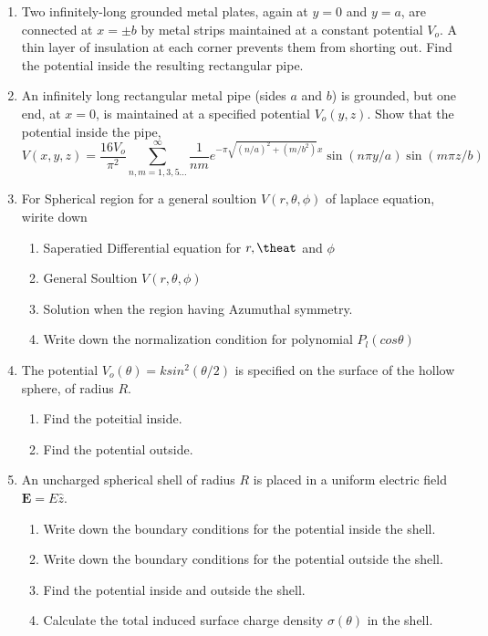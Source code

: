 \documentclass{bookq}[12pt, a4paper]
\newcommand{\gfrac}[2]{\frac{\displaystyle #1}{\displaystyle #2}}
\begin{document}
\begin{enumerate}
\item Two inﬁnitely-long grounded metal plates, again at $y = 0$ and
$y = a$, are connected at $x = \pm b$ by metal strips maintained at a constant potential
$V_o$. A thin layer of insulation at each corner prevents them
from shorting out. Find the potential inside the resulting rectangular pipe.

\item An inﬁnitely long rectangular metal pipe (sides $a$ and $b$) is
grounded, but one end, at $x = 0$, is maintained at a speciﬁed potential $V_o (y, z)$. Show that the potential inside the pipe,
$$
V(x, y, z) = \gfrac{16V_o}{\pi^2} \sum_{n, m = 1, 3, 5 \dots}^{\infty} \gfrac{1}{nm}e^{-\pi\sqrt{(n/a)^2 + (m/b^2)}x}\sin(n\pi y/a)\sin(m \pi z/b)
$$

\item For Spherical region for a general soultion $V(r, \theta, \phi)$ of laplace equation, wirite down
\begin{enumerate}
\item Saperatied Differential equation for $r, \theat$ and $\phi$
\item General Soultion $V(r, \theta, \phi)$
\item Solution when the region having Azumuthal symmetry.
\item Write down the normalization condition for polynomial $P_l(cos\theta)$
\end{enumerate}

\item The potential $V_o(\theta) = ksin^2(\theta / 2)$ is specified on the surface of the hollow sphere, of radius $R$.
\begin{enumerate}
	\item Find the poteitial inside.
	\item Find the potential outside.
\end{enumerate}

\item An uncharged spherical shell of radius $R$ is placed in a uniform electric field $\mathbf{E} = E\hat{z}$.
\begin{enumerate}
	\item Write down the boundary conditions for the potential inside the shell.
	\item Write down the boundary conditions for the potential outside the shell.
	\item Find the potential inside and outside the shell.
	\item Calculate the total induced surface charge density $\sigma(\theta)$ in the shell.
\end{enumerate}


\end{enumerate}
\end{document}
